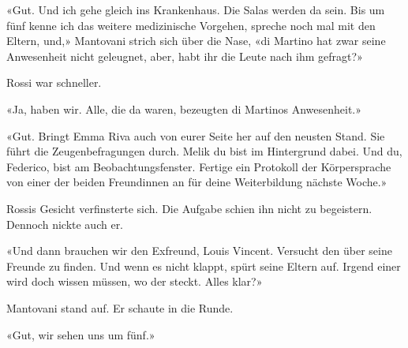 «Gut. Und ich gehe gleich ins Krankenhaus. Die Salas werden da sein. Bis
um fünf kenne ich das weitere medizinische Vorgehen, spreche noch mal
mit den Eltern, und,» Mantovani strich sich über die Nase, «di Martino
hat zwar seine Anwesenheit nicht geleugnet, aber, habt ihr die Leute
nach ihm gefragt?»

Rossi war schneller.

«Ja, haben wir. Alle, die da waren, bezeugten di Martinos Anwesenheit.»

«Gut. Bringt Emma Riva auch von eurer Seite her auf den neusten Stand.
Sie führt die Zeugenbefragungen durch. Melik du bist im Hintergrund
dabei. Und du, Federico, bist am Beobachtungsfenster. Fertige ein
Protokoll der Körpersprache von einer der beiden Freundinnen an für deine
Weiterbildung nächste Woche.»

Rossis Gesicht verfinsterte sich. Die Aufgabe schien ihn nicht zu
begeistern. Dennoch nickte auch er.

«Und dann brauchen wir den Exfreund, Louis Vincent. Versucht den über
seine Freunde zu finden. Und wenn es nicht klappt, spürt seine Eltern
auf. Irgend einer wird doch wissen müssen, wo der steckt. Alles klar?»

Mantovani stand auf. Er schaute in die Runde.

«Gut, wir sehen uns um fünf.»
